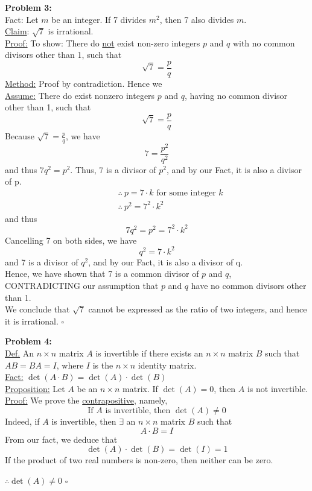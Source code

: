 \documentclass[letterpaper]{article}
\begin{document}
\bigskip

\noindent \textbf{Problem 3:}
\medskip \\
Fact: Let $m$ be an integer. If 7 divides $m^2$, then 7 also divides $m$.
\medskip \\
\underline{Claim}: $\sqrt{7}$ is irrational.
\medskip \\
\underline{Proof:} To show: There do \underline{not} exist non-zero integers $p$ and $q$ with no common divisors other than 1, such that
$$\sqrt{7}=\frac{p}{q}$$
\underline{Method:} Proof by contradiction. Hence we
\medskip \\
\underline{Assume:} There do exist nonzero integers $p$ and $q$, having no common divisor other than 1, such that
$$\sqrt{7}=\frac{p}{q}$$
Because $\sqrt{7}=\frac{p}{q}$, we have
$$7=\frac{p^2}{q^2}$$
and thus $7q^2=p^2$. Thus, 7 is a divisor of $p^2$, and by our Fact, it is also a divisor of p.
$$\begin{aligned}
&~~~~~~~~~~~\therefore~p=7\cdot k \text{     for some integer } k \\
&~~~~~~~~~~~\therefore~p^2=7^2\cdot k^2
\end{aligned}$$
and thus
$$ 7q^2=p^2=7^2 \cdot k^2$$
Cancelling 7 on both sides, we have
$$q^2=7\cdot k^2$$
and 7 is a divisor of $q^2$, and by our Fact, it is also a divisor of q.
\medskip \\
Hence, we have shown that 7 is a common divisor of $p$ and $q$, CONTRADICTING our assumption that $p$ and $q$ have no common divisors other than 1.
\medskip \\
We conclude that $\sqrt{7}$ cannot be expressed as the ratio of two integers, and hence it is irrational.
\hfill $\square$

\bigskip
\noindent \textbf{Problem 4:}
\medskip \\
\underline{Def.} An $n \times n$ matrix $A$ is invertible if there exists an $n \times n$ matrix $B$ such that $AB=BA=I$, where $I$ is the $n \times n$ identity matrix.
\medskip \\
\underline{Fact:} $\det(A \cdot B)=\det(A)\cdot \det(B)$
\medskip \\
\underline{Proposition:} Let $A$ be an $n \times n$ matrix. If $\det(A)=0$, then $A$ is not invertible.
\medskip \\
\underline{Proof:} We prove the \underline{contrapositive}, namely,
$$ \text{If } A \text{ is invertible, then } \det(A) \not=0$$
Indeed, if $A$ is invertible, then $\exists$ an $n \times n$ matrix $B$ such that
$$A \cdot B=I$$
From our fact, we deduce that
$$ \det(A) \cdot \det(B) = \det(I) = 1$$
If the product of two real numbers is non-zero, then neither can be zero. \par
\null\hfill $\therefore \det(A) \not=0$ \hfill $\square$
\end{document}
